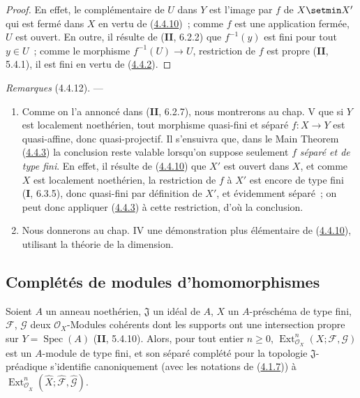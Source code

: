 \begin{proof}
En effet, le complémentaire de $U$ dans $Y$ est l'image par $f$ de $X\setmin X'$ qui
est fermé dans $X$ en vertu de (\hyperref[III.4.4.10-fr]{4.4.10})~; comme $f$
est une application fermée, $U$ est ouvert. En outre, il résulte de
(\textbf{II}, 6.2.2) que $f^{-1}(y)$ est fini pour tout $y\in U$~; comme le morphisme
$f^{-1}(U)\to U$, restriction de $f$ est propre (\textbf{II}, 5.4.1), il est fini en
vertu de (\hyperref[III.4.4.2-fr]{4.4.2}).
\end{proof}

\begin{env}[4.4.12]
\label{III.4.4.12-fr}
\emph{Remarques} (4.4.12). ---
\begin{enumerate}
\item[(i)] Comme on l'a annoncé dans (\textbf{II}, 6.2.7), nous montrerons au chap. V
que si $Y$ est localement noethérien, tout morphisme quasi-fini et séparé
$f:X\to Y$ est quasi-affine, donc quasi-projectif. Il s'ensuivra que, dans le
Main Theorem (\hyperref[III.4.4.3-fr]{4.4.3}) la conclusion reste valable
lorsqu'on suppose seulement $f$ \emph{séparé et de type fini}. En effet, il résulte
de (\hyperref[III.4.4.10-fr]{4.4.10}) que $X'$ est ouvert dans $X$, et comme
$X$ est localement noethérien, la restriction de $f$ à $X'$ est encore de
type fini (\textbf{I}, 6.3.5), donc quasi-fini par définition de $X'$, et évidemment
séparé~; on peut donc appliquer (\hyperref[III.4.4.3-fr]{4.4.3}) à cette
restriction, d'où la conclusion.

\item[(ii)] Nous donnerons au chap. IV une démonstration plus élémentaire de
(\hyperref[III.4.4.10-fr]{4.4.10}), utilisant la théorie de la dimension.
\end{enumerate}
\end{env}

\subsection{Complétés de modules d'homomorphismes}
\label{subsection:III.4.5-fr}

\begin{proposition}[4.5.1]
\label{III.4.5.1-fr}
Soient $A$ un anneau noethérien, $\mathfrak J$ un idéal de $A$, $X$ un
$A$-préschéma de type fini, $\mathcal F$, $\mathcal G$ deux
$\mathcal O_X$-Modules cohérents dont les supports ont une intersection
propre sur $Y=\operatorname{Spec}(A)$ \textup{(\textbf{II}, 5.4.10)}. Alors, pour tout entier
$n\geq0$, $\operatorname{Ext}^n_{\mathcal O_X}(X;\mathcal F,\mathcal G)$ est un $A$-module
de type fini, et son séparé complété pour la topologie $\mathfrak J$-préadique
s'identifie canoniquement (avec les notations de
\textup{(\hyperref[III.4.1.7-fr]{4.1.7})}) à
$\operatorname{Ext}^n_{\mathcal O_{\widehat X}}(\widehat X;\widehat{\mathcal F},
\widehat{\mathcal G})$.
\end{proposition}

